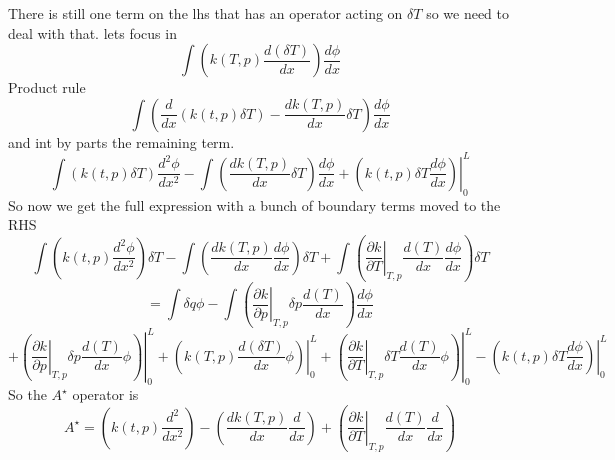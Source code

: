 \documentclass[11pt]{article}
\begin{document}
There is still one term on the lhs that has an operator acting on $\delta T$ so we need to deal with that. lets focus in
\[
\int \left( k(T,p) \frac{d(\delta T)}{dx} \right)\frac{d \phi}{dx}
\] 
Product rule
\[
\int \left( \frac{d}{dx} (k(t,p) \delta T)- \frac{d k(T,p)}{dx}\delta T \right)\frac{d \phi}{dx}
\]
and int by parts the remaining term.
\[
\int \left( k(t,p) \delta T\right)\frac{d^2 \phi}{dx^2}
- \int \left( \frac{d k(T,p)}{dx}\delta T \right)\frac{d \phi}{dx}
+ \left.\left( k(t,p) \delta T \frac{d \phi}{dx}  \right) \right|_0^L
\]
So now we get the full expression with a bunch of boundary terms moved to the RHS 
\[
\int \left( k(t,p) \frac{d^2 \phi}{dx^2} \right) \delta T 
- \int \left( \frac{d k(T,p)}{dx} \frac{d \phi}{dx} \right)\delta T 
+\int \left(\left.\frac{\partial k}{\partial T}\right|_{T,p} \frac{d(T)}{dx} \frac{d \phi}{dx} \right)\delta T
\]
\[
= \int \delta q \phi 
-\int \left(\left.\frac{\partial k}{\partial p}\right|_{T,p}\delta p \frac{d(T)}{dx} \right)\frac{d \phi}{dx}
\]
\[
+ \left. \left(\left.\frac{\partial k}{\partial p}\right|_{T,p}\delta p \frac{d(T)}{dx} \phi \right) \right|_0^L
+ \left. \left( k(T,p) \frac{d(\delta T)}{dx} \phi \right) \right|_0^L 
+ \left. \left(\left.\frac{\partial k}{\partial T}\right|_{T,p}\delta T \frac{d(T)}{dx} \phi \right ) \right|_0^L
- \left.\left( k(t,p) \delta T \frac{d \phi}{dx}  \right) \right|_0^L
\] 
So the $A^\star$ operator is
\[
A^\star = \left( k(t,p) \frac{d^2}{dx^2} \right) 
- \left( \frac{d k(T,p)}{dx} \frac{d}{dx} \right) 
+ \left(\left.\frac{\partial k}{\partial T}\right|_{T,p} \frac{d(T)}{dx} \frac{d}{dx} \right)
\]
\end{document}
